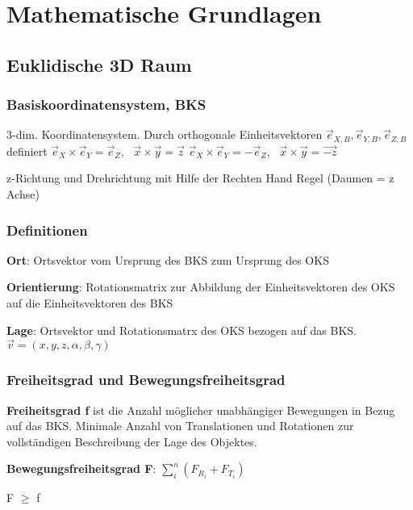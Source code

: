 \chapter{Mathematische Grundlagen}

\section{Euklidische 3D Raum}
\subsection{Basiskoordinatensystem, BKS}
3-dim. Koordinatensystem. Durch orthogonale Einheitsvektoren $\vec{e}_{X,B}, \vec{e}_{Y,B},
\vec{e}_{Z,B}$ definiert
 $\vec{e}_{X} \times \vec{e}_{Y} = \vec{e}_{Z},\text{ }\vec{x} \times \vec{y} = \vec{z}$
 $\vec{e}_{X} \times \vec{e}_{Y} = -\vec{e}_{Z},\text{ }\vec{x} \times \vec{y} = \vec{-z}$

z-Richtung und Drehrichtung mit Hilfe der Rechten Hand Regel (Daumen = z Achse)

\subsection{Definitionen}
\begin{compactitem}
    \item \textbf{Ort}: Ortsvektor vom Ursprung des BKS zum Ursprung des OKS
    \item \textbf{Orientierung}: Rotationsmatrix zur Abbildung der Einheitsvektoren des OKS auf die
    Einheitsvektoren des BKS
    \item \textbf{Lage}: Ortsvektor und Rotationsmatrx des OKS bezogen auf das BKS.
    $\vec{v} = (x,y,z,\alpha,\beta,\gamma)$
\end{compactitem}

\subsection{Freiheitsgrad und Bewegungsfreiheitsgrad}
\begin{compactitem}
    \item \textbf{Freiheitsgrad f} ist die Anzahl möglicher unabhängiger Bewegungen in Bezug auf
    das BKS. Minimale Anzahl von Translationen und Rotationen zur vollständigen Beschreibung der Lage des
    Objektes.
    \item \textbf{Bewegungsfreiheitsgrad F}: $\sum_{i}^n(F_{R_i} + F_{T_i})$
    \item F $\geq$ f
\end{compactitem}
\newpage
